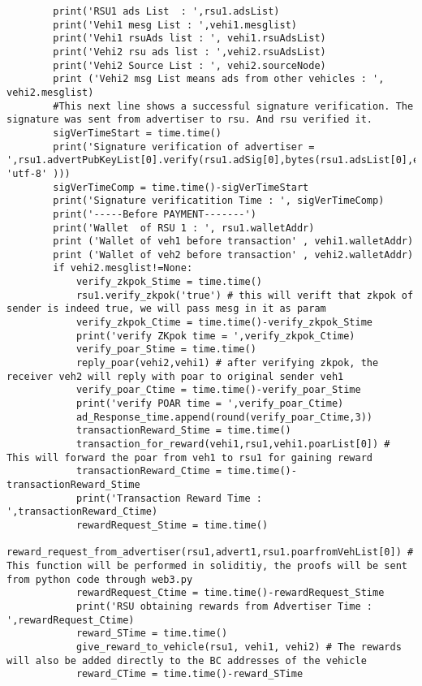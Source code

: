 \begin{linenumbers}
\begin{lstlisting}
        print('RSU1 ads List  : ',rsu1.adsList)
        print('Vehi1 mesg List : ',vehi1.mesglist)
        print('Vehi1 rsuAds list : ', vehi1.rsuAdsList)
        print('Vehi2 rsu ads list : ',vehi2.rsuAdsList)
        print('Vehi2 Source List : ', vehi2.sourceNode)
        print ('Vehi2 msg List means ads from other vehicles : ', vehi2.mesglist)
        #This next line shows a successful signature verification. The signature was sent from advertiser to rsu. And rsu verified it.
        sigVerTimeStart = time.time()
        print('Signature verification of advertiser = ',rsu1.advertPubKeyList[0].verify(rsu1.adSig[0],bytes(rsu1.adsList[0],encoding= 'utf-8' )))
        sigVerTimeComp = time.time()-sigVerTimeStart
        print('Signature verificatition Time : ', sigVerTimeComp)
        print('-----Before PAYMENT-------')
        print('Wallet  of RSU 1 : ', rsu1.walletAddr)
        print ('Wallet of veh1 before transaction' , vehi1.walletAddr)
        print ('Wallet of veh2 before transaction' , vehi2.walletAddr)
        if vehi2.mesglist!=None:
            verify_zkpok_Stime = time.time()
            rsu1.verify_zkpok('true') # this will verift that zkpok of sender is indeed true, we will pass mesg in it as param
            verify_zkpok_Ctime = time.time()-verify_zkpok_Stime
            print('verify ZKpok time = ',verify_zkpok_Ctime)
            verify_poar_Stime = time.time()
            reply_poar(vehi2,vehi1) # after verifying zkpok, the receiver veh2 will reply with poar to original sender veh1
            verify_poar_Ctime = time.time()-verify_poar_Stime
            print('verify POAR time = ',verify_poar_Ctime)
            ad_Response_time.append(round(verify_poar_Ctime,3))
            transactionReward_Stime = time.time()
            transaction_for_reward(vehi1,rsu1,vehi1.poarList[0]) # This will forward the poar from veh1 to rsu1 for gaining reward
            transactionReward_Ctime = time.time()-transactionReward_Stime
            print('Transaction Reward Time : ',transactionReward_Ctime)
            rewardRequest_Stime = time.time()
            reward_request_from_advertiser(rsu1,advert1,rsu1.poarfromVehList[0]) # This function will be performed in soliditiy, the proofs will be sent from python code through web3.py
            rewardRequest_Ctime = time.time()-rewardRequest_Stime
            print('RSU obtaining rewards from Advertiser Time : ',rewardRequest_Ctime)
            reward_STime = time.time()
            give_reward_to_vehicle(rsu1, vehi1, vehi2) # The rewards will also be added directly to the BC addresses of the vehicle
            reward_CTime = time.time()-reward_STime

\end{lstlisting}
\end{linenumbers}
